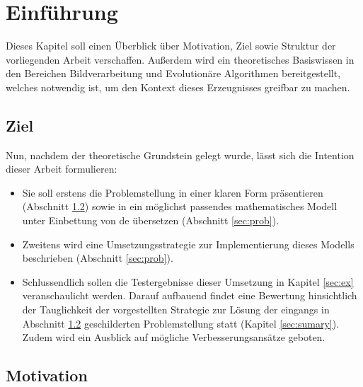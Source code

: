 
\chapter{Einführung}
\label{sec:intro}
	Dieses Kapitel soll einen Überblick über Motivation, Ziel sowie Struktur der vorliegenden Arbeit verschaffen. Außerdem wird ein theoretisches Basiswissen in den Bereichen Bildverarbeitung und Evolutionäre Algorithmen bereitgestellt, welches notwendig ist, um den Kontext dieses Erzeugnisses greifbar zu machen. 
	
	
	
	\section{Ziel}
	\label{sec:ziel}
	
		Nun, nachdem der theoretische Grundstein gelegt wurde, lässt sich die Intention dieser Arbeit formulieren:
		\begin{itemize}
			\item Sie soll erstens die Problemstellung in einer klaren Form präsentieren (Abschnitt \ref{sec:motivation}) sowie in ein möglichst passendes mathematisches Modell unter Einbettung von \gls{de} übersetzen (Abschnitt \ref{sec:prob}).
			\item Zweitens wird eine Umsetzungsstrategie zur Implementierung dieses Modells beschrieben (Abschnitt \ref{sec:prob}).
			\item Schlussendlich sollen die Testergebnisse dieser Umsetzung in Kapitel \ref{sec:ex} veranschaulicht werden. Darauf aufbauend findet eine Bewertung hinsichtlich der Tauglichkeit der vorgestellten Strategie zur Lösung der eingangs in Abschnitt \ref{sec:motivation} geschilderten Problemstellung statt (Kapitel \ref{sec:sumary}). Zudem wird ein Ausblick auf mögliche Verbesserungsansätze geboten. 
		\end{itemize}
	
	\section{Motivation}
	\label{sec:motivation}